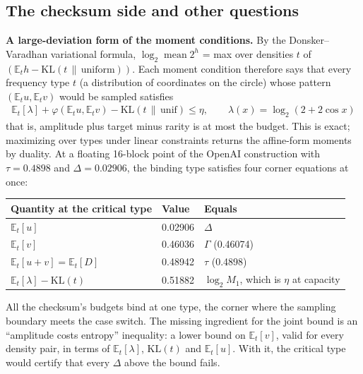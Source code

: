 \documentclass[11pt]{article}
\DeclareMathOperator{\mean}{mean}
\newcommand{\E}{\mathbb{E}}
\newcommand{\KL}{\mathrm{KL}}
\theoremstyle{plain}
\begin{document}
\subsection*{The checksum side and other questions}

\textbf{A large-deviation form of the moment conditions.} By the Donsker--Varadhan variational formula, $\log_2 \mean 2^h$ = max over densities $t$ of $(\E_t h - \KL(t \,\|\, \mathrm{uniform}))$. Each moment condition therefore says that every frequency type $t$ (a distribution of coordinates on the circle) whose pattern $(\E_t u, \E_t v)$ would be sampled satisfies
\begin{gather*}
\mathbb E_t[\lambda] + \varphi(\mathbb E_t u, \mathbb E_t v) - \mathrm{KL}(t \,\|\, \mathrm{unif}) \le \eta, \qquad \lambda(x) = \log_2(2+2\cos x)
\end{gather*}
that is, amplitude plus target minus rarity is at most the budget. This is exact; maximizing over types under linear constraints returns the affine-form moments by duality. At a floating 16-block point of the OpenAI construction with $\tau = 0.4898$ and $\Delta = 0.02906$, the binding type satisfies four corner equations at once:

\begin{center}
\small
\begin{tabular}{lll}
\toprule
Quantity at the critical type & Value & Equals \\
\midrule
$\E_t[u]$ & 0.02906 & $\Delta$ \\
$\E_t[v]$ & 0.46036 & $\Gamma$ (0.46074) \\
$\E_t[u + v] = \E_t[D]$ & 0.48942 & $\tau$ (0.4898) \\
$\E_t[\lambda] - \KL(t)$ & 0.51882 & $\log_2 M_1$, which is $\eta$ at capacity \\
\bottomrule
\end{tabular}
\end{center}

All the checksum's budgets bind at one type, the corner where the sampling boundary meets the case switch. The missing ingredient for the joint bound is an ``amplitude costs entropy'' inequality: a lower bound on $\E_t[v]$, valid for every density pair, in terms of $\E_t[\lambda]$, $\KL(t)$ and $\E_t[u]$. With it, the critical type would certify that every $\Delta$ above the bound fails.
\end{document}
